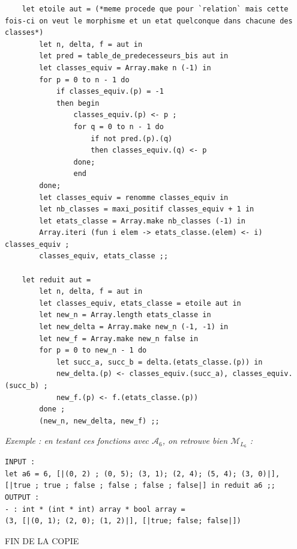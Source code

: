 \documentclass{article}
\begin{document}
\begin{enumerate}
\begin{verbatim}
    let etoile aut = (*meme procede que pour `relation` mais cette fois-ci on veut le morphisme et un etat quelconque dans chacune des classes*)
        let n, delta, f = aut in
        let pred = table_de_predecesseurs_bis aut in
        let classes_equiv = Array.make n (-1) in
        for p = 0 to n - 1 do
            if classes_equiv.(p) = -1
            then begin 
                classes_equiv.(p) <- p ;
                for q = 0 to n - 1 do 
                    if not pred.(p).(q) 
                    then classes_equiv.(q) <- p
                done;
                end
        done;
        let classes_equiv = renomme classes_equiv in
        let nb_classes = maxi_positif classes_equiv + 1 in
        let etats_classe = Array.make nb_classes (-1) in
        Array.iteri (fun i elem -> etats_classe.(elem) <- i) classes_equiv ;
        classes_equiv, etats_classe ;;

    let reduit aut = 
        let n, delta, f = aut in 
        let classes_equiv, etats_classe = etoile aut in
        let new_n = Array.length etats_classe in
        let new_delta = Array.make new_n (-1, -1) in 
        let new_f = Array.make new_n false in 
        for p = 0 to new_n - 1 do
            let succ_a, succ_b = delta.(etats_classe.(p)) in 
            new_delta.(p) <- classes_equiv.(succ_a), classes_equiv.(succ_b) ;
            new_f.(p) <- f.(etats_classe.(p))
        done ;
        (new_n, new_delta, new_f) ;;
    \end{verbatim}

    \textit{Exemple : en testant ces fonctions avec $\mathcal{A}_6$, on retrouve bien $\mathcal{M}_{L_6}$ :}
    \begin{verbatim}
INPUT :
let a6 = 6, [|(0, 2) ; (0, 5); (3, 1); (2, 4); (5, 4); (3, 0)|], [|true ; true ; false ; false ; false ; false|] in reduit a6 ;;
OUTPUT : 
- : int * (int * int) array * bool array =
(3, [|(0, 1); (2, 0); (1, 2)|], [|true; false; false|])
    \end{verbatim}
\end{enumerate}

\null
\begin{center}
        F\footnotesize{IN DE LA COPIE}
    \end{center}
\end{document}
